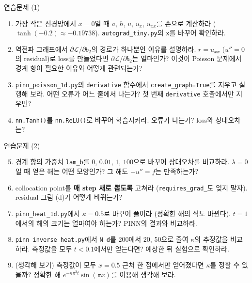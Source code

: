\documentclass[aspectratio=169,11pt]{beamer}
\newcommand{\loss}{\mathcal{L}}
\begin{document}
\begin{frame}{연습문제 (1)}
\small
\begin{enumerate}
\item 가장 작은 신경망에서 $x=0$일 때 $a$, $h$, $u$, $u_x$, $u_{xx}$를 손으로 계산하라 ($\tanh(-0.2)\approx-0.19738$).
\texttt{autograd\_tiny.py}의 \texttt{x}를 바꾸어 확인하라.
\item 역전파 그래프에서 $\partial\loss/\partial b_2$의 경로가 하나뿐인 이유를 설명하라.
$r=u_{xx}$ ($u''=0$의 residual)로 loss를 만들었다면 $\partial\loss/\partial b_2$는 얼마인가? 이것이 Poisson 문제에서 경계 항이 필요한 이유와 어떻게 관련되는가?
\item \texttt{pinn\_poisson\_1d.py}의 \texttt{derivative} 함수에서 \texttt{create\_graph=True}를 지우고 실행해 보라.
어떤 오류가 어느 줄에서 나는가? 첫 번째 \texttt{derivative} 호출에서만 지우면?
\item \texttt{nn.Tanh()}를 \texttt{nn.ReLU()}로 바꾸어 학습시켜라. 오류가 나는가? loss와 상대오차는?
\end{enumerate}
\end{frame}

\begin{frame}{연습문제 (2)}
\small
\begin{enumerate}
\setcounter{enumi}{4}
\item 경계 항의 가중치 \texttt{lam\_b}를 $0$, $0.01$, $1$, $100$으로 바꾸어 상대오차를 비교하라.
$\lambda=0$일 때 얻은 해는 어떤 모양인가? 그 해도 $-u''=f$는 만족하는가?
\item collocation point를 \textbf{매 step 새로 뽑도록} 고쳐라 (\texttt{requires\_grad\_}도 잊지 말자). residual 그림 (d)가 어떻게 바뀌는가?
\item \texttt{pinn\_heat\_1d.py}에서 $\kappa=0.5$로 바꾸어 풀어라 (정확한 해의 식도 바뀐다).
$t=1$에서의 해의 크기는 얼마여야 하는가? PINN의 결과와 비교하라.
\item \texttt{pinn\_inverse\_heat.py}에서 \texttt{N\_d}를 $200$에서 $20$, $50$으로 줄여 $\kappa$의 추정값을 비교하라.
측정값을 모두 $t<0.1$에서만 얻는다면? 예상한 뒤 실험으로 확인하라.
\item (생각해 보기) 측정값이 모두 $x=0.5$ 근처 한 점에서만 얻어졌다면 $\kappa$를 정할 수 있을까?
정확한 해 $e^{-\kappa\pi^2t}\sin(\pi x)$를 이용해 생각해 보라.
\end{enumerate}
\end{frame}
\end{document}
